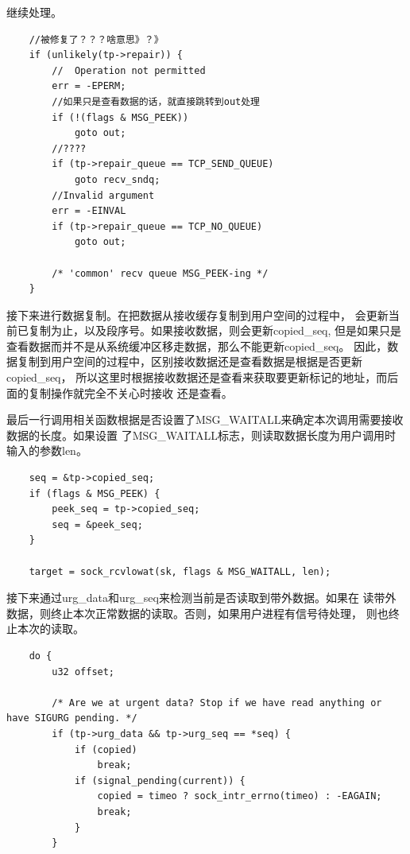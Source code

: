     继续处理。
\begin{verbatim}
    //被修复了？？？啥意思》？》
    if (unlikely(tp->repair)) {
        //  Operation not permitted
        err = -EPERM;
        //如果只是查看数据的话，就直接跳转到out处理
        if (!(flags & MSG_PEEK))
            goto out;
        //????
        if (tp->repair_queue == TCP_SEND_QUEUE)
            goto recv_sndq;
        //Invalid argument
        err = -EINVAL
        if (tp->repair_queue == TCP_NO_QUEUE)
            goto out;

        /* 'common' recv queue MSG_PEEK-ing */
    }
\end{verbatim}
    
    接下来进行数据复制。在把数据从接收缓存复制到用户空间的过程中，
    会更新当前已复制为止，以及段序号。如果接收数据，则会更新copied\_seq,
    但是如果只是查看数据而并不是从系统缓冲区移走数据，那么不能更新copied\_seq。
    因此，数据复制到用户空间的过程中，区别接收数据还是查看数据是根据是否更新copied\_seq，
    所以这里时根据接收数据还是查看来获取要更新标记的地址，而后面的复制操作就完全不关心时接收
    还是查看。
    
    最后一行调用相关函数根据是否设置了MSG\_WAITALL来确定本次调用需要接收数据的长度。如果设置
    了MSG\_WAITALL标志，则读取数据长度为用户调用时输入的参数len。
\begin{verbatim}
    seq = &tp->copied_seq;
    if (flags & MSG_PEEK) {
        peek_seq = tp->copied_seq;
        seq = &peek_seq;
    }

    target = sock_rcvlowat(sk, flags & MSG_WAITALL, len);
\end{verbatim}

    接下来通过urg\_data和urg\_seq来检测当前是否读取到带外数据。如果在
    读带外数据，则终止本次正常数据的读取。否则，如果用户进程有信号待处理，
    则也终止本次的读取。
\begin{verbatim}
    do {
        u32 offset;

        /* Are we at urgent data? Stop if we have read anything or have SIGURG pending. */
        if (tp->urg_data && tp->urg_seq == *seq) {
            if (copied)
                break;
            if (signal_pending(current)) {
                copied = timeo ? sock_intr_errno(timeo) : -EAGAIN;
                break;
            }
        }
\end{verbatim}


